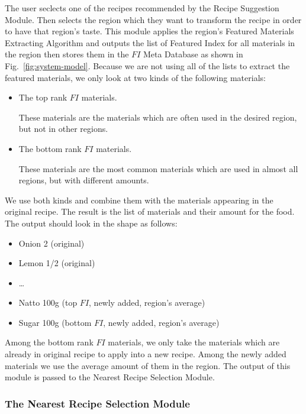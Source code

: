 \documentclass{sig-alternate}
\begin{document}
The user seclects one of the recipes recommended by the Recipe Suggestion Module. Then selects the region which they want to transform the recipe in order to have that region's taste. This module applies the region's Featured Materials Extracting Algorithm and outputs the list of Featured Index for all materials in the region then stores them in the $FI$ Meta Database as shown in Fig.~\ref{fig:system-model}. Because we are not using all of the lists to extract the featured materials, we only look at two kinds of the following materials: 

\begin{itemize}
\item The top rank $FI$ materials.

These materials are the materials which are often used in the desired region, but not in other regions. 
\item The bottom rank $FI$ materials.

These materials are the most common materials which are used in almost all regions, but with different amounts. 
	 
\end{itemize}

We use both kinds and combine them with the materials appearing in the original recipe. The result is the list of materials and their amount for the food. The output should look in the shape as follows:

\begin{itemize}
\item Onion 2     (original)
\item Lemon 1/2   (original)
\item \ldots
\item Natto 100g  (top $FI$, newly added, region's average)
\item Sugar 100g  (bottom $FI$, newly added, region's average)
\end{itemize}

Among the bottom rank $FI$ materials, we only take the materials which are already in original recipe to apply into a new recipe. Among the newly added materials we use the average amount of them in the region. The output of this module is passed to the Nearest Recipe Selection Module. 
 
\subsubsection{The Nearest Recipe Selection Module} 
\end{document}
